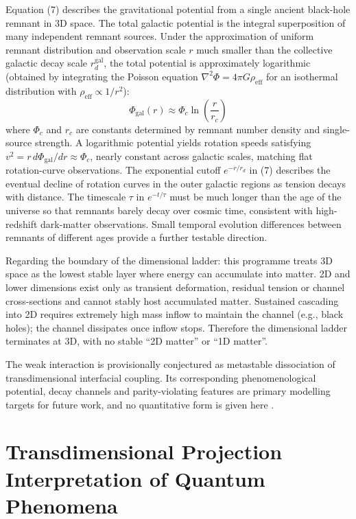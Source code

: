\documentclass[12pt,a4paper]{article}
\begin{document}
Equation (7) describes the gravitational potential from a single ancient black-hole remnant in 3D space. The total galactic potential is the integral superposition of many independent remnant sources. Under the approximation of uniform remnant distribution and observation scale $r$ much smaller than the collective galactic decay scale $r_d^{\text{gal}}$, the total potential is approximately logarithmic (obtained by integrating the Poisson equation $\nabla^2\Phi=4\pi G\rho_{\text{eff}}$ for an isothermal distribution with $\rho_{\text{eff}}\propto 1/r^2$):
\begin{equation*}
\Phi_{\text{gal}}(r) \approx \Phi_c \ln\left(\frac{r}{r_c}\right) \tag{7b}
\end{equation*}
where $\Phi_c$ and $r_c$ are constants determined by remnant number density and single-source strength. A logarithmic potential yields rotation speeds satisfying $v^2 = r \, d\Phi_{\text{gal}}/dr \approx \Phi_c$, nearly constant across galactic scales, matching flat rotation-curve observations. The exponential cutoff $e^{-r/r_d}$ in (7) describes the eventual decline of rotation curves in the outer galactic regions as tension decays with distance. The timescale $\tau$ in $e^{-t/\tau}$ must be much longer than the age of the universe so that remnants barely decay over cosmic time, consistent with high-redshift dark-matter observations. Small temporal evolution differences between remnants of different ages provide a further testable direction.

Regarding the boundary of the dimensional ladder: this programme treats 3D space as the lowest stable layer where energy can accumulate into matter. 2D and lower dimensions exist only as transient deformation, residual tension or channel cross-sections and cannot stably host accumulated matter. Sustained cascading into 2D requires extremely high mass inflow to maintain the channel (e.g., black holes); the channel dissipates once inflow stops. Therefore the dimensional ladder terminates at 3D, with no stable “2D matter” or “1D matter”.

The weak interaction is provisionally conjectured as metastable dissociation of transdimensional interfacial coupling. Its corresponding phenomenological potential, decay channels and parity-violating features are primary modelling targets for future work, and no quantitative form is given here \cite{weinberg1967, wilczek2004}.

\section{Transdimensional Projection Interpretation of Quantum Phenomena}
\end{document}
